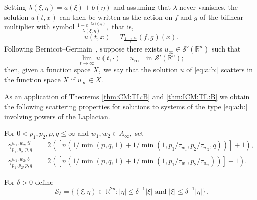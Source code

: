 \documentclass[10pt,a4paper]{article}
\theoremstyle{remark}
\newcommand{\re}{\mathbb{R}}
\newcommand{\rn}{{{\mathbb R}^n}}
\newcommand{\swp}{{\mathcal{S}'}(\rn)}
\newcommand{\Ss}{\mathcal{S}}
\newcommand{\abs}[1]{\left\vert #1 \right\vert}
\newcommand{\gamt}{\gamma_{p_1,p_2,p,q}^{w_1,w_2, tl}}
\newcommand{\gamb}{\gamma_{p_1,p_2,p,q}^{w_1,w_2,b}}
\begin{document}
Setting $\lambda(\xi,\eta)=a(\xi)+b(\eta)$ and assuming that $\lambda$ never vanishes, the solution $u(t,x)$ can then be written as the action on $f$ and $g$ of the bilinear multiplier  with symbol $\frac{1-e^{-t\lambda(\xi,\eta)}}{\lambda(\xi,\eta)},$ that is,  
\begin{equation}\label{u:T:lambda}
u(t,x) = T_{\frac{1-e^{-t\lambda}}{\lambda}}(f,g)(x).
\end{equation}
Following Bernicot--Germain~\cite[Section 9.4]{MR2680189}, suppose there exists   $u_\infty\in \swp$ such that 
\begin{equation}\label{def:u:infty}
\lim\limits_{t \to \infty} u(t, \cdot ) = u_\infty \quad \text{in } \swp;
\end{equation}
then, given a function space $X$, we say that the solution $u$ of  \eqref{eq:a:b:} scatters in the function space $X$ if $u_\infty \in X.$

As an application of Theorems \ref{thm:CM:TL:B} and \ref{thm:ICM:TL:B} we obtain the following scattering properties for solutions to  systems of the type \eqref{eq:a:b:} involving powers of the Laplacian. 

  

For $0<p_1,p_2, p, q\le \infty$ and $w_1,w_2\in A_\infty,$ set
\begin{align*}
\gamt&=2( [n(1/\min(p,q,1)+1/\min(1,p_1/\tau_{w_1},p_2/\tau_{w_2},q))]+1),\\
 \gamb&=2( [n(1/\min(p,q,1)+1/\min(1,p_1/\tau_{w_1},p_2/\tau_{w_2}))]+1).
\end{align*}


For $\delta>0$ define
$$
\Ss_{\delta}=\{(\xi,\eta)\in \re^{2n}: \abs{\eta}\le \delta^{-1}\abs{\xi}\text{ and }\abs{\xi}\le \delta^{-1}\abs{\eta}\}.
$$
\end{document}
